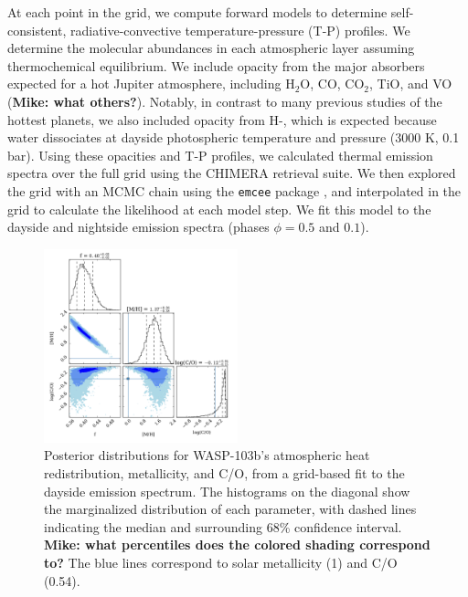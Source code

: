 \documentclass[twocolumn]{aastex61}
\begin{document}
At each point in the grid, we compute forward models to determine self-consistent, radiative-convective temperature-pressure (T-P) profiles. We determine the molecular abundances in each atmospheric layer assuming thermochemical equilibrium.  We include opacity from the major absorbers expected for a hot Jupiter atmosphere, including H$_2$O, CO, CO$_2$, TiO, and VO (\textbf{Mike: what others?}). Notably, in contrast to many previous studies of the hottest planets, we also included opacity from H-, which is expected because water dissociates at dayside photospheric temperature and pressure (3000 K, 0.1 bar).  Using these opacities and T-P profiles, we calculated thermal emission spectra over the full grid using the CHIMERA retrieval suite.  We then explored the grid with an MCMC chain using the \texttt{emcee} package \citep{foremanmackey13}, and interpolated in the grid to calculate the likelihood at each model step. We fit this model to the dayside and nightside emission spectra (phases $\phi = 0.5$ and $0.1$). 

\begin{figure}
\includegraphics[width = 0.5\textwidth]{Figures/WASP-103b_grid_DAYSIDE_stair_pairs_02.pdf}
\caption{Posterior distributions for WASP-103b's atmospheric heat redistribution, metallicity, and C/O, from a grid-based fit to the dayside emission spectrum. The histograms on the diagonal show the marginalized distribution of each parameter, with dashed lines indicating the median and surrounding 68\% confidence interval. \textbf{Mike: what percentiles does the colored shading correspond to?} The blue lines correspond to solar metallicity (1) and C/O (0.54).}
\label{fig:composition}
\end{figure}
\end{document}
